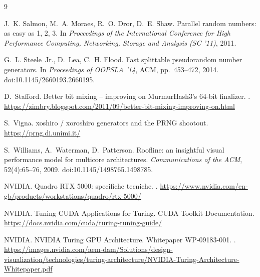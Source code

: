 \documentclass[11pt,a4paper]{article}
\begin{document}
\clearpage
{}
{}
\begin{thebibliography}{9}

J.~K. Salmon, M.~A. Moraes, R.~O. Dror, D.~E. Shaw.
\newblock Parallel random numbers: as easy as 1, 2, 3.
\newblock In \emph{Proceedings of the International Conference for High
Performance Computing, Networking, Storage and Analysis (SC '11)}, 2011.

G.~L. Steele~Jr., D.~Lea, C.~H. Flood.
\newblock Fast splittable pseudorandom number generators.
\newblock In \emph{Proceedings of OOPSLA '14}, ACM, pp.~453--472, 2014.
\newblock doi:10.1145/2660193.2660195.

D.~Stafford.
\newblock Better bit mixing -- improving on MurmurHash3's 64-bit finalizer.
.
\newblock \url{https://zimbry.blogspot.com/2011/09/better-bit-mixing-improving-on.html}

S.~Vigna.
\newblock xoshiro / xoroshiro generators and the PRNG shootout.
\newblock \url{https://prng.di.unimi.it/}

S.~Williams, A.~Waterman, D.~Patterson.
\newblock Roofline: an insightful visual performance model for multicore
architectures.
\newblock \emph{Communications of the ACM}, 52(4):65--76, 2009.
\newblock doi:10.1145/1498765.1498785.

NVIDIA.
\newblock Quadro RTX 5000: specifiche tecniche.
.
\newblock \url{https://www.nvidia.com/en-gb/products/workstations/quadro/rtx-5000/}

NVIDIA.
\newblock Tuning CUDA Applications for Turing.
\newblock CUDA Toolkit Documentation.
\newblock \url{https://docs.nvidia.com/cuda/turing-tuning-guide/}

NVIDIA.
\newblock NVIDIA Turing GPU Architecture. Whitepaper WP-09183-001.
.
\newblock \url{https://images.nvidia.com/aem-dam/Solutions/design-visualization/technologies/turing-architecture/NVIDIA-Turing-Architecture-Whitepaper.pdf}

\end{thebibliography}
\end{document}
